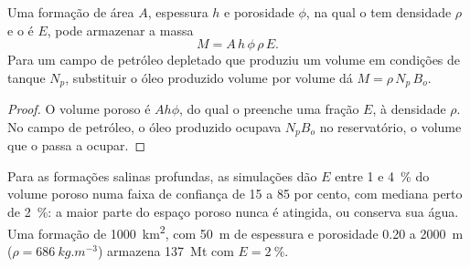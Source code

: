 \begin{omfigure}
\begin{minipage}[b]{0.49\linewidth}
\end{minipage}
\par{}
\end{omfigure}

\begin{proposition}\label{prop:b2:energy-geology:capacity}
Uma formação de área $A$, espessura $h$ e porosidade $\phi$, na qual o  tem densidade $\rho$
e o  é $E$, pode armazenar a massa
\begin{equation}
M = A\,h\,\phi\,\rho\,E .
\label{eq:b2:energy-geology:capacity}
\end{equation}
Para um campo de petróleo depletado que produziu um volume em condições de tanque $N_p$, substituir o óleo produzido
volume por volume dá $M = \rho\,N_p\,B_o$.
\end{proposition}

\begin{proof}
O volume poroso é $Ah\phi$, do qual o  preenche uma fração $E$, à densidade $\rho$. No
campo de petróleo, o óleo produzido ocupava $N_pB_o$ no reservatório, o volume que o  passa a ocupar.
\end{proof}

Para as formações salinas profundas, as simulações dão $E$ entre 1 e \qty{4}{\percent} do volume poroso
numa faixa de confiança de 15 a 85 por cento, com mediana perto de \qty{2}{\percent}: a maior parte do espaço
poroso nunca é atingida, ou conserva sua água. Uma formação de \qty{1000}{km^2}, com \qty{50}{m} de espessura e
porosidade 0.20 a \qty{2000}{m} ($\rho = \qty{686}{kg.m^{-3}}$) armazena \qty{137}{Mt} com $E =
\qty{2}{\percent}$.

